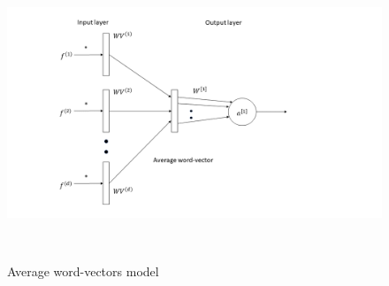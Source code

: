 \begin{figure}[htbp]
\centering
\includegraphics[width=16cm, height=8cm]{images/average-vectors2.png}\\
\centering
\caption{Average word-vectors model}
\label{fig:foo}
\end{figure}

